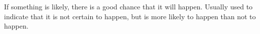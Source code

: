If something is likely, there is a good chance that
it will happen. Usually used to indicate that it is not certain to happen, but is more likely to happen than not to happen.